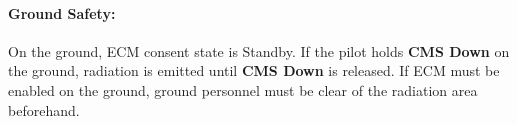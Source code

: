 \documentclass[11pt, a4paper, twoside]{report}
\begin{document}
\paragraph{Ground Safety:}

On the ground, ECM consent state is Standby. If the pilot holds \textbf{CMS Down} on the ground, radiation is emitted until \textbf{CMS Down} is released. If ECM must be enabled on the ground, ground personnel must be clear of the radiation area beforehand.

\end{document}
